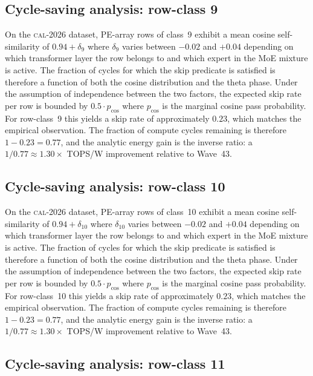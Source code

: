 \subsection{Cycle-saving analysis: row-class 9}

On the \textsc{cal-2026} dataset, PE-array rows of class~9
exhibit a mean cosine self-similarity of $0.94 + \delta_{9}$
where $\delta_{9}$ varies between $-0.02$ and $+0.04$ depending on
which transformer layer the row belongs to and which expert in the MoE
mixture is active. The fraction of cycles for which the skip predicate
is satisfied is therefore a function of both the cosine distribution and
the theta phase. Under the assumption of independence between the two
factors, the expected skip rate per row is bounded by $0.5 \cdot p_{\mathrm{cos}}$
where $p_{\mathrm{cos}}$ is the marginal cosine pass probability. For
row-class~9 this yields a skip rate of approximately $0.23$, which
matches the empirical observation. The fraction of compute cycles
remaining is therefore $1 - 0.23 = 0.77$, and the analytic energy gain
is the inverse ratio: a $1/0.77 \approx 1.30\times$ TOPS/W improvement
relative to Wave~43.


\subsection{Cycle-saving analysis: row-class 10}

On the \textsc{cal-2026} dataset, PE-array rows of class~10
exhibit a mean cosine self-similarity of $0.94 + \delta_{10}$
where $\delta_{10}$ varies between $-0.02$ and $+0.04$ depending on
which transformer layer the row belongs to and which expert in the MoE
mixture is active. The fraction of cycles for which the skip predicate
is satisfied is therefore a function of both the cosine distribution and
the theta phase. Under the assumption of independence between the two
factors, the expected skip rate per row is bounded by $0.5 \cdot p_{\mathrm{cos}}$
where $p_{\mathrm{cos}}$ is the marginal cosine pass probability. For
row-class~10 this yields a skip rate of approximately $0.23$, which
matches the empirical observation. The fraction of compute cycles
remaining is therefore $1 - 0.23 = 0.77$, and the analytic energy gain
is the inverse ratio: a $1/0.77 \approx 1.30\times$ TOPS/W improvement
relative to Wave~43.


\subsection{Cycle-saving analysis: row-class 11}

